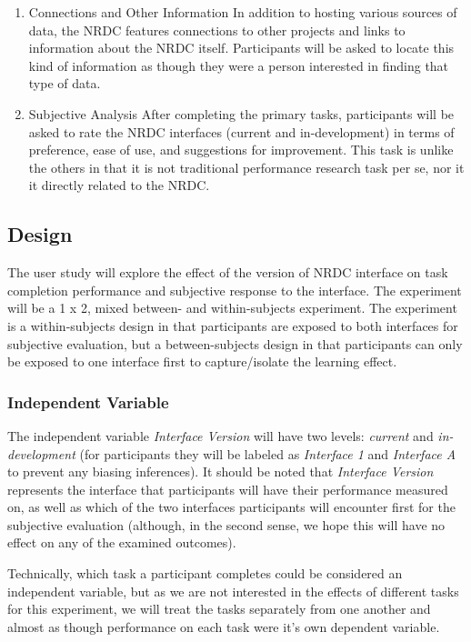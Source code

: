 \documentclass{article}
\begin{document}
\begin{enumerate}
\item Connections and Other Information
In addition to hosting various sources of data, the NRDC features connections to other projects and links to information about the NRDC itself. Participants will be asked to locate this kind of information as though they were a person interested in finding that type of data.

\item Subjective Analysis
After completing the primary tasks, participants will be asked to rate the NRDC interfaces (current and in-development) in terms of preference, ease of use, and suggestions for improvement. This task is unlike the others in that it is not traditional performance research task per se, nor it it directly related to the NRDC.

%
\end{enumerate}

%
\subsection{Design}
The user study will explore the effect of the version of NRDC interface on task completion performance and subjective response to the interface. The experiment will be a 1 x 2, mixed between- and within-subjects experiment. The experiment is a within-subjects design in that participants are exposed to both interfaces for subjective evaluation, but a between-subjects design in that participants can only be exposed to one interface first to capture/isolate the learning effect.

\subsubsection{Independent Variable}
The independent variable \emph{Interface Version} will have two levels: \emph{current} and \emph{in-development} (for participants they will be labeled as \emph{Interface 1} and \emph{Interface A} to prevent any biasing inferences). It should be noted that \emph{Interface Version} represents the interface that participants will have their performance measured on, as well as which of the two interfaces participants will encounter first for the subjective evaluation (although, in the second sense, we hope this will have no effect on any of the examined outcomes).

Technically, which task a participant completes could be considered an independent variable, but as we are not interested in the effects of different tasks for this experiment, we will treat the tasks separately from one another and almost as though performance on each task were it's own dependent variable.
\end{document}
